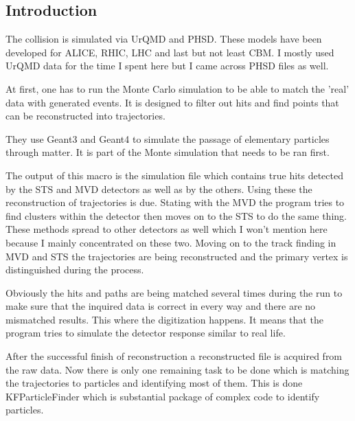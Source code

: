 \documentclass[a4paper,12pt]{article}
\begin{document}
\subsection{ Introduction}
\vspace{5mm}
\par The collision is simulated via UrQMD and PHSD. These models have been developed for ALICE, RHIC, LHC and last but not 
least CBM. I mostly used UrQMD data for the time I spent here but I came across PHSD files as well.
\vspace{5mm}
\par At first, one has to run the Monte Carlo simulation to be able to match the 'real' data with generated events. It is
 designed to filter out hits and find points that can be reconstructed into trajectories.
\vspace{5mm}
\par They use Geant3 and Geant4 to simulate the passage of elementary particles through matter. It is part of the Monte 
 simulation that needs to be ran first.
\vspace{5mm}
\par The output of this macro is the simulation file which contains true hits detected by the STS and MVD detectors as well
 as by the others. Using these the reconstruction of trajectories is due. Stating with the MVD the program tries to find clusters 
 within the detector then moves on to the STS to do the same thing. These methods spread to other detectors as well which I won't
  mention here because I mainly concentrated on these two. Moving on to the track finding in MVD and STS the trajectories are being
   reconstructed and the primary vertex is distinguished during the process. 
\vspace{5mm}
\par Obviously the hits and paths are being matched several times during the run to make sure that the inquired data is correct
 in every way and there are no mismatched results. This where the digitization happens. It means that the program tries to simulate
 the detector response similar to real life.
\vspace{5mm}
\par After the successful finish of reconstruction a reconstructed file is acquired from the raw data. Now there is only one
 remaining task to be done which is matching the trajectories to particles and identifying most of them. This is done 
  KFParticleFinder which is substantial package of complex code to identify particles.
\vspace{5mm}
\end{document}
